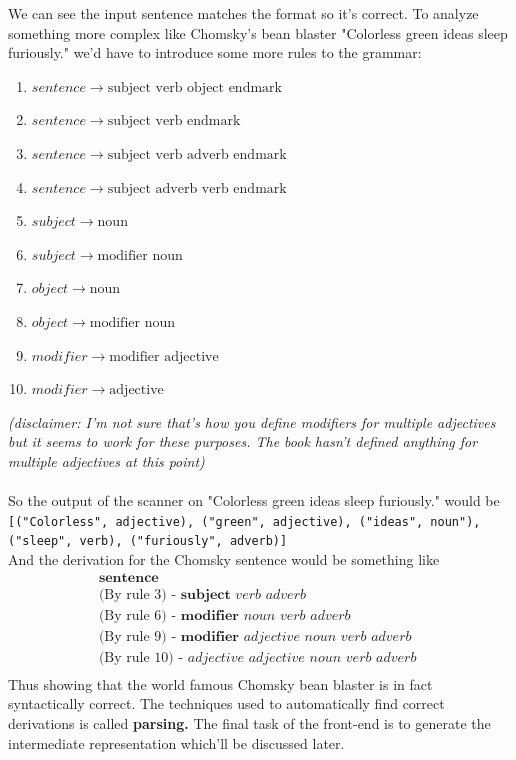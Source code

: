 \documentclass{article}
\begin{document}
We can see the input sentence matches the format so it's correct. To analyze something more complex like Chomsky's bean blaster "Colorless green ideas sleep furiously." we'd have to introduce some more rules to the grammar:
\begin{enumerate}
  \item $sentence\rightarrow \text{subject verb object endmark}$
  \item $sentence\rightarrow \text{subject verb endmark}$
  \item $sentence\rightarrow \text{subject verb adverb endmark}$
  \item $sentence\rightarrow \text{subject adverb verb endmark}$
  \item $subject\rightarrow \text{noun}$
  \item $subject\rightarrow \text{modifier noun}$
  \item $object \rightarrow \text{noun}$
  \item $object \rightarrow \text{modifier noun}$
  \item $modifier \rightarrow \text{modifier adjective}$
  \item $modifier \rightarrow \text{adjective}$
\end{enumerate}
\textit{(disclaimer: I'm not sure that's how you define modifiers for multiple adjectives but it seems to work for these purposes. The book hasn't defined anything for multiple adjectives at this point)}\\\\
So the output of the scanner on "Colorless green ideas sleep furiously." would be \\
\texttt{[("Colorless", adjective), ("green", adjective), ("ideas", noun"), ("sleep", verb), ("furiously", adverb)]}\\
And the derivation for the Chomsky sentence would be something like\\
\begin{align*}
        \textbf{sentence}\\
        \text{(By rule 3) - } \textbf{subject } \textit{verb } \textit{adverb }\\
        \text{(By rule 6) - } \textbf{modifier } \textit{noun } \textit{verb } \textit{adverb }\\
        \text{(By rule 9) - }\textbf{modifier } \textit{adjective } \textit{noun } \textit{verb } \textit{adverb }\\
        \text{(By rule 10) - }\textit{adjective } \textit{adjective } \textit{noun } \textit{verb } \textit{adverb }\\
\end{align*}
Thus showing that the world famous Chomsky bean blaster is in fact syntactically correct. The techniques used to automatically find correct derivations is called \textbf{parsing.} The final task of the front-end is to generate the intermediate representation which'll be discussed later.
\end{document}
